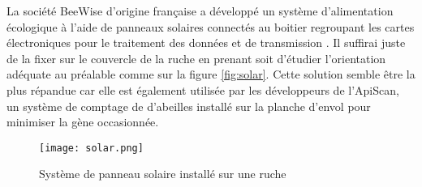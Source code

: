 La société BeeWise d'origine française a développé un système d'alimentation écologique à l'aide de panneaux solaires connectés au  boitier regroupant les cartes électroniques pour le traitement des données et de transmission \cite{BeeWise}. Il suffirai juste de la fixer sur le couvercle de la ruche en prenant soit d'étudier l'orientation adéquate au préalable comme sur la figure \ref{fig:solar}. Cette solution semble être la plus répandue car elle est également utilisée par les développeurs de l'ApiScan, un système de comptage de d'abeilles installé sur la planche d'envol pour minimiser la gène occasionnée.    

\begin{figure}[h]
\centering\texttt{[image: solar.png]}
\caption{\label{fig:app} Système de panneau solaire installé sur une ruche}
\end{figure} 

   